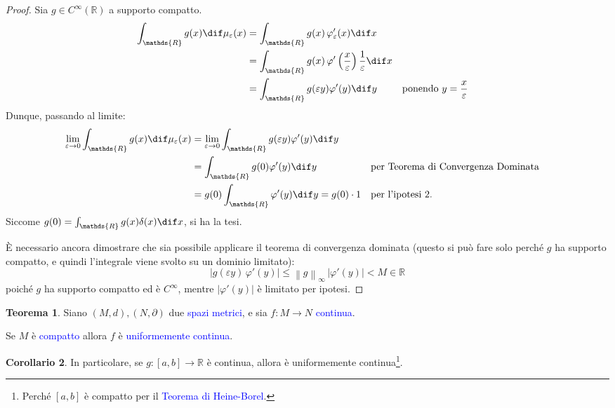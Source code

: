 \documentclass[10pt]{book}
\newcommand{\1}{\mathds{1}}
\newcommand{\R}{\mathds{R}}
\newcommand{\norma}[1]{%
\left\lVert#1\right\rVert%
}
\theoremstyle{definition}%
\newtheorem{thm}{Teorema}[section]
\newtheorem{cor}[thm]{Corollario}
\theoremstyle{plain}
\theoremstyle{remark}
\renewcommand{\href}[2]{\textcolor{blue}{#2}}
\begin{document}
\begin{proof}
Sia \(g \in C^{\infty}(\R)\) a supporto compatto.
\begin{align*}
\int_{\R}g(x)\dif\mu_{\varepsilon}(x) &= \int_{\R} g(x)\,\varphi_{\varepsilon}'(x)\dif x\\
&= \int_{\R} g(x)\,\varphi'\left(\frac{x}{\varepsilon}\right)\frac{1}{\varepsilon}\dif x\\
&= \int_{\R} g(\varepsilon y)\varphi'(y) \dif y & &\text{ponendo }y=\frac{x}{\varepsilon}
\end{align*}
Dunque, passando al limite:
\begin{align*}
\lim_{\varepsilon\to 0}\int_{\R}g(x)\dif\mu_{\varepsilon}(x) &= \lim_{\varepsilon\to {0}}\int_{\R}g(\varepsilon y)\varphi'(y)\dif y\\
&= \int_{\R}g(0)\varphi'(y)\dif y & &\text{per Teorema di Convergenza Dominata}\\
&= g(0) \int_{\R}\varphi'(y)\dif y = g(0) \cdot 1 & &\text{per l'ipotesi 2.}
\end{align*}
Siccome \(g(0)=\int_{\R}g(x)\delta(x)\dif x\), si ha la tesi.

È necessario ancora dimostrare che sia possibile applicare il teorema di convergenza dominata (questo si può fare solo perché \(g\) ha supporto compatto, e quindi l'integrale viene svolto su un dominio limitato):
\begin{equation*}
|g(\varepsilon y)\,\varphi'(y)| \le \norma{g}_{\infty}\,|\varphi'(y)| < M \in \R
\end{equation*}
poiché \(g\) ha supporto compatto ed è \(C^{\infty}\), mentre \(|\varphi'(y)|\) è limitato per ipotesi.
\end{proof}
\begin{thm}
Siano \((M,d), (N, \partial)\) due \href{../../../../../org/roam/20250301193511-spazio_metrico.org}{spazi metrici}, e sia \(f:M\to N\) \href{../../../../../org/roam/20250103103252-funzione_continua.org}{continua}.

Se \(M\) è \href{../../../../../org/roam/20250103163701-spazio_topologico_compatto.org}{compatto} allora \(f\) è \href{../../../../../org/roam/20250611135127-funzione_uniformemente_continua.org}{uniformemente continua}.
\end{thm}

\begin{cor}
In particolare, se \(g:[a,b]\to \R\) è continua, allora è uniformemente continua\footnote{Perché \([a,b]\) è compatto per il \href{../../../../../org/roam/20250701121640-teorema_di_heine_borel.org}{Teorema di Heine-Borel}.}.
\end{cor}
\end{document}
